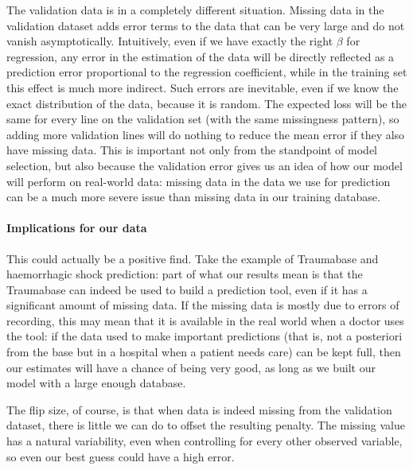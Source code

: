 The validation data is in a completely different situation. Missing data in the validation dataset adds error terms to the data that can be very large and do not vanish asymptotically. Intuitively, even if we have exactly the right $\beta$ for regression, any error in the estimation of the data will be directly reflected as a prediction error proportional to the regression coefficient, while in the training set this effect is much more indirect. Such errors are inevitable, even if we know the exact distribution of the data, because it is random. The expected loss will be the same for every line on the validation set (with the same missingness pattern), so adding more validation lines will do nothing to reduce the mean error if they also have missing data. This is important not only from the standpoint of model selection, but also because the validation error gives us an idea of how our model will perform on real-world data: missing data in the data we use for prediction can be a much more severe issue than missing data in our training database.

\paragraph{Implications for our data}

This could actually be a positive find. Take the example of Traumabase and haemorrhagic shock prediction: part of what our results mean is that the Traumabase can indeed be used to build a prediction tool, even if it has a significant amount of missing data. If the missing data is mostly due to errors of recording, this may mean that it is available in the real world when a doctor uses the tool: if the data used to make important predictions (that is, not a posteriori from the base but in a hospital when a patient needs care) can be kept full, then our estimates will have a chance of being very good, as long as we built our model with a large enough database.

The flip size, of course, is that when data is indeed missing from the validation dataset, there is little we can do to offset the resulting penalty. The missing value has a natural variability, even when controlling for every other observed variable, so even our best guess could have a high error. 

